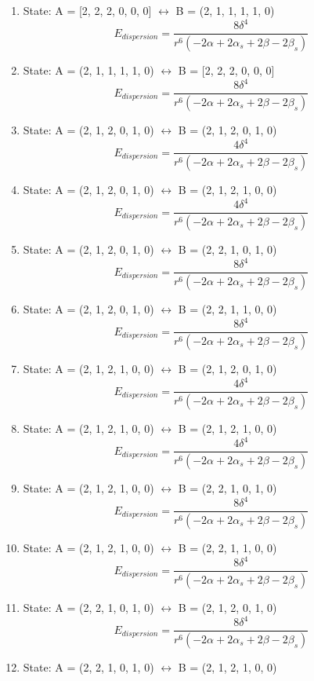 \documentclass[12pt,a4paper]{article}
\begin{document}
\begin{enumerate}
 \item State: A = [2, 2, 2, 0, 0, 0] $\leftrightarrow$ B = (2, 1, 1, 1, 1, 0) 
$$E_{dispersion} =\frac{8 \delta^{4}}{r^{6} \left(- 2 \alpha + 2 \alpha_{s} + 2 \beta - 2 \beta_{s}\right)}$$
 \item State: A = (2, 1, 1, 1, 1, 0) $\leftrightarrow$ B = [2, 2, 2, 0, 0, 0] 
$$E_{dispersion} =\frac{8 \delta^{4}}{r^{6} \left(- 2 \alpha + 2 \alpha_{s} + 2 \beta - 2 \beta_{s}\right)}$$
 \item State: A = (2, 1, 2, 0, 1, 0) $\leftrightarrow$ B = (2, 1, 2, 0, 1, 0) 
$$E_{dispersion} =\frac{4 \delta^{4}}{r^{6} \left(- 2 \alpha + 2 \alpha_{s} + 2 \beta - 2 \beta_{s}\right)}$$
 \item State: A = (2, 1, 2, 0, 1, 0) $\leftrightarrow$ B = (2, 1, 2, 1, 0, 0) 
$$E_{dispersion} =\frac{4 \delta^{4}}{r^{6} \left(- 2 \alpha + 2 \alpha_{s} + 2 \beta - 2 \beta_{s}\right)}$$
 \item State: A = (2, 1, 2, 0, 1, 0) $\leftrightarrow$ B = (2, 2, 1, 0, 1, 0) 
$$E_{dispersion} =\frac{8 \delta^{4}}{r^{6} \left(- 2 \alpha + 2 \alpha_{s} + 2 \beta - 2 \beta_{s}\right)}$$
 \item State: A = (2, 1, 2, 0, 1, 0) $\leftrightarrow$ B = (2, 2, 1, 1, 0, 0) 
$$E_{dispersion} =\frac{8 \delta^{4}}{r^{6} \left(- 2 \alpha + 2 \alpha_{s} + 2 \beta - 2 \beta_{s}\right)}$$
 \item State: A = (2, 1, 2, 1, 0, 0) $\leftrightarrow$ B = (2, 1, 2, 0, 1, 0) 
$$E_{dispersion} =\frac{4 \delta^{4}}{r^{6} \left(- 2 \alpha + 2 \alpha_{s} + 2 \beta - 2 \beta_{s}\right)}$$
 \item State: A = (2, 1, 2, 1, 0, 0) $\leftrightarrow$ B = (2, 1, 2, 1, 0, 0) 
$$E_{dispersion} =\frac{4 \delta^{4}}{r^{6} \left(- 2 \alpha + 2 \alpha_{s} + 2 \beta - 2 \beta_{s}\right)}$$
 \item State: A = (2, 1, 2, 1, 0, 0) $\leftrightarrow$ B = (2, 2, 1, 0, 1, 0) 
$$E_{dispersion} =\frac{8 \delta^{4}}{r^{6} \left(- 2 \alpha + 2 \alpha_{s} + 2 \beta - 2 \beta_{s}\right)}$$
 \item State: A = (2, 1, 2, 1, 0, 0) $\leftrightarrow$ B = (2, 2, 1, 1, 0, 0) 
$$E_{dispersion} =\frac{8 \delta^{4}}{r^{6} \left(- 2 \alpha + 2 \alpha_{s} + 2 \beta - 2 \beta_{s}\right)}$$
 \item State: A = (2, 2, 1, 0, 1, 0) $\leftrightarrow$ B = (2, 1, 2, 0, 1, 0) 
$$E_{dispersion} =\frac{8 \delta^{4}}{r^{6} \left(- 2 \alpha + 2 \alpha_{s} + 2 \beta - 2 \beta_{s}\right)}$$
 \item State: A = (2, 2, 1, 0, 1, 0) $\leftrightarrow$ B = (2, 1, 2, 1, 0, 0) 

\end{enumerate}
\end{document}
